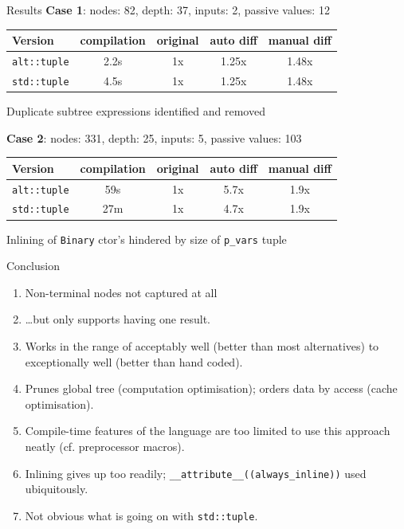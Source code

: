 \documentclass[xcolor=dvipsnames]{beamer}
\begin{document}
\begin{frame}[fragile]{Results}
\textbf{Case 1}: nodes: 82, depth: 37, inputs: 2, passive values: 12
\begin{table}
\begin{tabular}{l | c | c | c | c }
Version & compilation & original & auto diff & manual diff \\
\hline \hline
\texttt{alt::tuple} & 2.2s & 1x & 1.25x & 1.48x \\
\texttt{std::tuple} & 4.5s & 1x & 1.25x & 1.48x \\
\end{tabular}
\end{table}
\-\hspace{5mm} Duplicate subtree expressions identified and removed
\vspace{5mm}

\textbf{Case 2}: nodes: 331, depth: 25, inputs: 5, passive values: 103
\begin{table}
\begin{tabular}{l | c | c | c | c }
Version & compilation & original & auto diff & manual diff \\
\hline \hline
\texttt{alt::tuple} & 59s & 1x & 5.7x & 1.9x \\
\texttt{std::tuple} & 27m & 1x & 4.7x & 1.9x \\
\end{tabular}
\end{table}
\-\hspace{5mm} Inlining of \texttt{Binary} ctor's hindered by size of \texttt{p\_vars} tuple
\end{frame}


\begin{frame}[fragile]{Conclusion}
  \begin{enumerate}
  \item Non-terminal nodes not captured at all \vspace{3mm}
  \item \ldots but only supports having one result. \vspace{3mm}
  \item Works in the range of acceptably well (better than most alternatives) to exceptionally well (better than hand coded). \vspace{3mm}
  \item Prunes global tree (computation optimisation); orders data by access (cache optimisation). \vspace{3mm}
  \item Compile-time features of the language are too limited to use this approach neatly (cf. preprocessor macros). \vspace{3mm}
  \item Inlining gives up too readily; \verb$__attribute__((always_inline))$ used ubiquitously. \vspace{3mm}
  \item Not obvious what is going on with \verb$std::tuple$. \vspace{3mm}
  \end{enumerate}
\end{frame}
\end{document}
